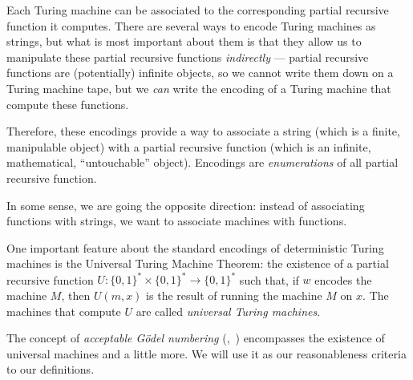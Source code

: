 \documentclass[12pt]{article}
\theoremstyle{definition}
\begin{document}
Each Turing machine can be associated
to the corresponding partial recursive function it computes.
There are several ways to encode Turing machines as strings,
but what is most important about them is that they allow us
to manipulate these partial recursive functions \emph{indirectly}
--- partial recursive functions are (potentially) infinite objects,
so we cannot write them down on a Turing machine tape,
but we \emph{can} write the encoding of a Turing machine that compute these functions.

Therefore,
these encodings provide a way to associate a string
(which is a finite, manipulable object)
with a partial recursive function
(which is an infinite, mathematical, ``untouchable'' object).
Encodings are \emph{enumerations} of all partial recursive function.

In some sense,
we are going the opposite direction:
instead of associating functions with strings,
we want to associate machines with functions.

One important feature about the standard encodings of deterministic Turing machines
is the Universal Turing Machine Theorem:
the existence of a partial recursive function
$U: \{0, 1\}^* \times \{0, 1\}^* \to \{0, 1\}^*$
such that, if $w$ encodes the machine $M$,
then $U(m, x)$ is the result of running the machine $M$ on $x$.
The machines that compute $U$ are called \emph{universal Turing machines}.

The concept of \emph{acceptable Gödel numbering}
(\cite[p.~41]{Rogers1987},~\cite[p.~324]{Blum1967})
encompasses the existence of universal machines and a little more.
We will use it as our reasonableness criteria to our definitions.%
\end{document}
